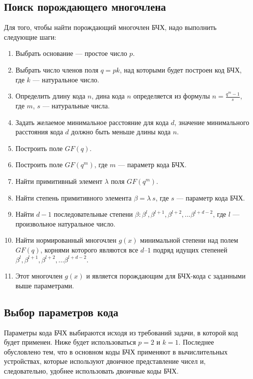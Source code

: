\subsection{Поиск порождающего многочлена}
Для того, чтобы найти порождающий многочлен БЧХ, надо выполнить следующие шаги:
\begin{enumerate}
  \item Выбрать основание --- простое число $p$.
  \item Выбрать число членов поля $q=pk$, над которыми будет построен код БЧХ, где $k$ --- натуральное число.
  \item Определить длину кода $n$, дина кода $n$ определяется из формулы $n=\frac{q^m-1}{s}$, где $m$, $s$ ---
 натуральные числа.
  \item Задать желаемое минимальное расстояние для кода $d$, значение минимального расстояния кода $d$ должно 
быть меньше длины кода $n$.
  \item Построить поле $GF(q)$.
  \item Построить поле $GF(q^m)$, где $m$ --- параметр кода БЧХ.
  \item Найти примитивный элемент $\lambda$ поля $GF(q^m)$.
  \item Найти степень примитивного элемента $\beta=\lambda~s$, где $s$ --- параметр кода БЧХ.
  \item Найти $d-1$ последовательные степени $\beta: \beta^l, \beta^{l+1}, \beta^{l+2}, ... \beta^{l+d-2}$, 
где $l$ --- произвольное натуральное число.
  \item Найти нормированный многочлен $g(x)$ минимальной степени над полем $GF(q)$, корнями которого являются 
все $d–1$ подряд идущих степеней $\beta^l, \beta^{l+1}, \beta^{l+2}, ... \beta^{l+d-2}$.
  \item Этот многочлен $g(x)$ и является порождающим для БЧХ-кода с заданными выше параметрами.
\end{enumerate}

\subsection{Выбор параметров кода}
Параметры кода БЧХ выбираются исходя из требований задачи, в которой код будет применен. Ниже будет 
использоваться $p=2$ и $k=1$. Последнее обусловлено тем, что в основном коды БЧХ применяют в вычислительных 
устройствах, которые используют двоичное представление чисел и, следовательно, удобнее использовать двоичные 
коды БЧХ.

